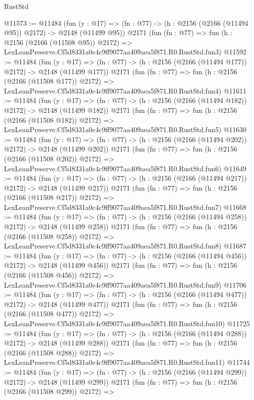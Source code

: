 \begin{lexlean}{RustStd}
\begin{coremodule}
@11573 := @11484
    (fun (y : @17) => (fn : @77) -> (h : @2156 (@2166 (@11494 @95)) @2172) -> @2148 (@11499 @95))
    @2171
    (fun (fn : @77) =>
    fun (h : @2156 (@2166 (@11508 @95)) @2172) =>
    LexLeanPreserve.Cf5d8331a0c4c9ff9077aa409aea5f871.R0.RustStd.fun3)
@11592 := @11484
    (fun (y : @17) => (fn : @77) -> (h : @2156 (@2166 (@11494 @177)) @2172) -> @2148 (@11499 @177))
    @2171
    (fun (fn : @77) =>
    fun (h : @2156 (@2166 (@11508 @177)) @2172) =>
    LexLeanPreserve.Cf5d8331a0c4c9ff9077aa409aea5f871.R0.RustStd.fun4)
@11611 := @11484
    (fun (y : @17) => (fn : @77) -> (h : @2156 (@2166 (@11494 @182)) @2172) -> @2148 (@11499 @182))
    @2171
    (fun (fn : @77) =>
    fun (h : @2156 (@2166 (@11508 @182)) @2172) =>
    LexLeanPreserve.Cf5d8331a0c4c9ff9077aa409aea5f871.R0.RustStd.fun5)
@11630 := @11484
    (fun (y : @17) => (fn : @77) -> (h : @2156 (@2166 (@11494 @202)) @2172) -> @2148 (@11499 @202))
    @2171
    (fun (fn : @77) =>
    fun (h : @2156 (@2166 (@11508 @202)) @2172) =>
    LexLeanPreserve.Cf5d8331a0c4c9ff9077aa409aea5f871.R0.RustStd.fun6)
@11649 := @11484
    (fun (y : @17) => (fn : @77) -> (h : @2156 (@2166 (@11494 @217)) @2172) -> @2148 (@11499 @217))
    @2171
    (fun (fn : @77) =>
    fun (h : @2156 (@2166 (@11508 @217)) @2172) =>
    LexLeanPreserve.Cf5d8331a0c4c9ff9077aa409aea5f871.R0.RustStd.fun7)
@11668 := @11484
    (fun (y : @17) => (fn : @77) -> (h : @2156 (@2166 (@11494 @258)) @2172) -> @2148 (@11499 @258))
    @2171
    (fun (fn : @77) =>
    fun (h : @2156 (@2166 (@11508 @258)) @2172) =>
    LexLeanPreserve.Cf5d8331a0c4c9ff9077aa409aea5f871.R0.RustStd.fun8)
@11687 := @11484
    (fun (y : @17) => (fn : @77) -> (h : @2156 (@2166 (@11494 @456)) @2172) -> @2148 (@11499 @456))
    @2171
    (fun (fn : @77) =>
    fun (h : @2156 (@2166 (@11508 @456)) @2172) =>
    LexLeanPreserve.Cf5d8331a0c4c9ff9077aa409aea5f871.R0.RustStd.fun9)
@11706 := @11484
    (fun (y : @17) => (fn : @77) -> (h : @2156 (@2166 (@11494 @477)) @2172) -> @2148 (@11499 @477))
    @2171
    (fun (fn : @77) =>
    fun (h : @2156 (@2166 (@11508 @477)) @2172) =>
    LexLeanPreserve.Cf5d8331a0c4c9ff9077aa409aea5f871.R0.RustStd.fun10)
@11725 := @11484
    (fun (y : @17) => (fn : @77) -> (h : @2156 (@2166 (@11494 @288)) @2172) -> @2148 (@11499 @288))
    @2171
    (fun (fn : @77) =>
    fun (h : @2156 (@2166 (@11508 @288)) @2172) =>
    LexLeanPreserve.Cf5d8331a0c4c9ff9077aa409aea5f871.R0.RustStd.fun11)
@11744 := @11484
    (fun (y : @17) => (fn : @77) -> (h : @2156 (@2166 (@11494 @299)) @2172) -> @2148 (@11499 @299))
    @2171
    (fun (fn : @77) =>
    fun (h : @2156 (@2166 (@11508 @299)) @2172) =>

\end{coremodule}
\end{lexlean}
